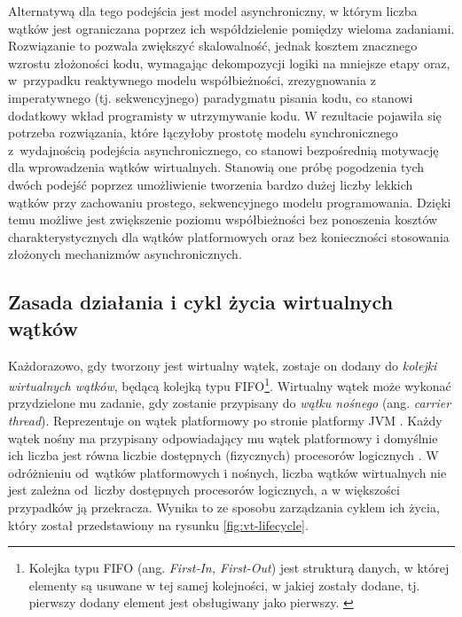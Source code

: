 Alternatywą dla tego podejścia jest model asynchroniczny, w którym liczba wątków jest ograniczana poprzez ich współdzielenie pomiędzy wieloma zadaniami. Rozwiązanie to pozwala zwiększyć skalowalność, jednak kosztem znacznego wzrostu złożoności kodu, wymagając dekompozycji logiki na mniejsze etapy oraz, w~przypadku reaktywnego modelu współbieżności, zrezygnowania z imperatywnego (tj. sekwencyjnego) paradygmatu pisania kodu, co stanowi dodatkowy wkład programisty w utrzymywanie kodu. W rezultacie pojawiła się potrzeba rozwiązania, które łączyłoby prostotę modelu synchronicznego z~wydajnością podejścia asynchronicznego, co stanowi bezpośrednią motywację dla wprowadzenia wątków wirtualnych. Stanowią one próbę pogodzenia tych dwóch podejść poprzez umożliwienie tworzenia bardzo dużej liczby lekkich wątków przy zachowaniu prostego, sekwencyjnego modelu programowania. Dzięki temu możliwe jest zwiększenie poziomu współbieżności bez ponoszenia kosztów charakterystycznych dla wątków platformowych oraz bez konieczności stosowania złożonych mechanizmów asynchronicznych.

\subsection{Zasada działania i cykl życia wirtualnych wątków}
\label{sec:virtual-threads-lifecycle}

Każdorazowo, gdy tworzony jest wirtualny wątek, zostaje on dodany do \emph{kolejki wirtualnych wątków}, będącą kolejką typu FIFO\footnote{Kolejka typu FIFO (ang. \emph{First-In, First-Out}) jest strukturą danych, w której elementy są usuwane w tej samej kolejności, w jakiej zostały dodane, tj. pierwszy dodany element jest obsługiwany jako pierwszy. \cite{cormen2009}}. Wirtualny wątek może wykonać przydzielone mu zadanie, gdy zostanie przypisany do \emph{wątku nośnego} (ang. \emph{carrier thread}). Reprezentuje on wątek platformowy po stronie platformy JVM \cite{veen2024}. Każdy wątek nośny ma przypisany odpowiadający mu wątek platformowy i domyślnie ich liczba jest równa liczbie dostępnych (fizycznych) procesorów logicznych \cite{openjdk-vt-presentation}. W odróżnieniu od~wątków platformowych i nośnych, liczba wątków wirtualnych nie jest zależna od~liczby dostępnych procesorów logicznych, a w większości przypadków ją przekracza. Wynika to ze sposobu zarządzania cyklem ich życia, który został przedstawiony na rysunku \ref{fig:vt-lifecycle}.

